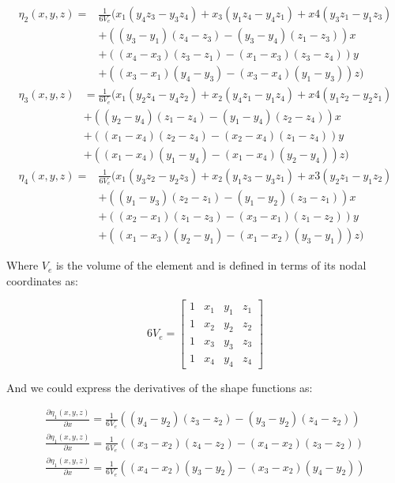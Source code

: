\documentclass[12pt]{article}
\begin{document}
\begin{align*}
\eta_2(x,y,z)=&\frac{1}{6V_e}(
x_1(y_4z_3-y_3z_4)+x_3(y_1z_4-y_4z_1)+x4(y_3z_1-y_1z_3) \\
&+ ((y_3-y_1)(z_4-z_3)-(y_3-y_4)(z_1-z_3))x \\
&+ ((x_4-x_3)(z_3-z_1)-(x_1-x_3)(z_3-z_4))y \\
&+ ((x_3-x_1)(y_4-y_3)-(x_3-x_4)(y_1-y_3))z)
\end{align*}
\begin{align*}
\eta_3(x,y,z)&=\frac{1}{6V_e}(
x_1(y_2z_4-y_4z_2)+x_2(y_4z_1-y_1z_4)+x4(y_1z_2-y_2z_1) \\
&+ ((y_2-y_4)(z_1-z_4)-(y_1-y_4)(z_2-z_4))x \\
&+ ((x_1-x_4)(z_2-z_4)-(x_2-x_4)(z_1-z_4))y \\
&+ ((x_1-x_4)(y_1-y_4)-(x_1-x_4)(y_2-y_4))z)
\end{align*}
\begin{align*}
\eta_4(x,y,z)=&\frac{1}{6V_e}(
x_1(y_3z_2-y_2z_3)+x_2(y_1z_3-y_3z_1)+x3(y_2z_1-y_1z_2) \\
&+ ((y_1-y_3)(z_2-z_1)-(y_1-y_2)(z_3-z_1))x \\
&+ ((x_2-x_1)(z_1-z_3)-(x_3-x_1)(z_1-z_2))y \\
&+ ((x_1-x_3)(y_2-y_1)-(x_1-x_2)(y_3-y_1))z)
\end{align*}

Where $V_e$ is the volume of the element and is defined in terms of its nodal coordinates as:

\begin{equation}
6V_e=\begin{bmatrix} 1 & x_1 & y_1 & z_1  \\ 1 & x_2 & y_2 & z_2  \\ 1 & x_3 & y_3 & z_3 \\ 1 & x_4 & y_4 & z_4 \end{bmatrix}
\end{equation}

And we could express the derivatives of the shape functions as:

\begin{align*}
\frac{\partial \eta_1(x,y,z)}{\partial x} = \frac{1}{6V_e}((y_4-y_2)(z_3-z_2)-(y_3-y_2)(z_4-z_2)) \\
\frac{\partial \eta_1(x,y,z)}{\partial x} = \frac{1}{6V_e}((x_3-x_2)(z_4-z_2)-(x_4-x_2)(z_3-z_2)) \\
\frac{\partial \eta_1(x,y,z)}{\partial x} = \frac{1}{6V_e}((x_4-x_2)(y_3-y_2)-(x_3-x_2)(y_4-y_2))
\end{align*}
\end{document}
